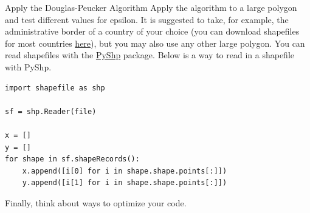 \documentclass[twoside]{article}
\begin{document}
\begin{task}{Apply the Douglas-Peucker Algorithm}{}{}
Apply the algorithm to a large polygon and test different values for epsilon. 
It is suggested to take, for example, the administrative border of a country of your choice (you can download shapefiles for most countries \href{https://www.diva-gis.org/gdata}{here}), but you may also use any other large polygon.
You can read shapefiles with the \href{https://pypi.org/project/pyshp/}{PyShp} package.
Below is a way to read in a shapefile with PyShp.

\begin{lstlisting}
import shapefile as shp 

sf = shp.Reader(file)

x = []
y = []
for shape in sf.shapeRecords():
    x.append([i[0] for i in shape.shape.points[:]])
    y.append([i[1] for i in shape.shape.points[:]])
\end{lstlisting}

Finally, think about ways to optimize your code.

\end{task}
\end{document}
